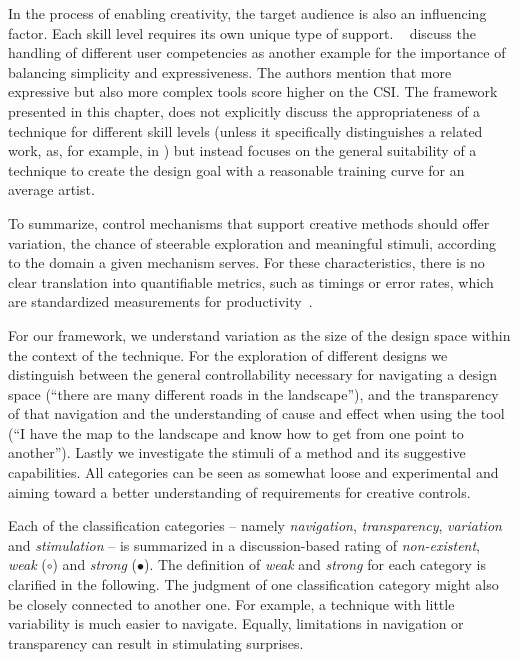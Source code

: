 In the process of enabling creativity, the target audience is also an influencing factor. Each skill level requires its own unique type of support. \citeauthor*{cherry_2014_qcs}~\cite{cherry_2014_qcs} discuss the handling of different user competencies as another example for the importance of balancing simplicity and expressiveness. The authors mention that more expressive but also more complex tools score higher on the CSI. The framework presented in this chapter, does not explicitly discuss the appropriateness of a technique for different skill levels (unless it specifically distinguishes a related work, as, for example, in \cite{benedetti_2014_pba}) but instead focuses on the general suitability of a technique to create the design goal with a reasonable training curve for an average artist.


To summarize, control mechanisms that support creative methods should offer variation, the chance of steerable exploration and meaningful stimuli, according to the domain a given mechanism serves. For these characteristics, there is no clear translation into quantifiable metrics, such as timings or error rates, which are standardized measurements for productivity~\cite{cherry_2014_qcs,shneiderman_2007_cst}.

For our framework, we understand variation as the size of the design space within the context of the technique. For the exploration of different designs we distinguish between the general controllability necessary for navigating a design space (``there are many different roads in the landscape''), and the transparency of that navigation and the understanding of cause and effect when using the tool (``I have the map to the landscape and know how to get from one point to another''). Lastly we investigate the stimuli of a method and its suggestive capabilities. All categories can be seen as somewhat loose and experimental and aiming toward a better understanding of requirements for creative controls.

Each of the classification categories – namely \textit{navigation}, \textit{transparency}, \textit{variation} and \textit{stimulation} – is summarized in a discussion-based rating of \textit{non-existent}, \textit{weak} ($\circ$) and \textit{strong} ($\bullet$). The definition of \textit{weak} and \textit{strong} for each category is clarified in the following. The judgment of one classification category might also be closely connected to another one. For example, a technique with little variability is much easier to navigate. Equally, limitations in navigation or transparency can result in stimulating surprises.

